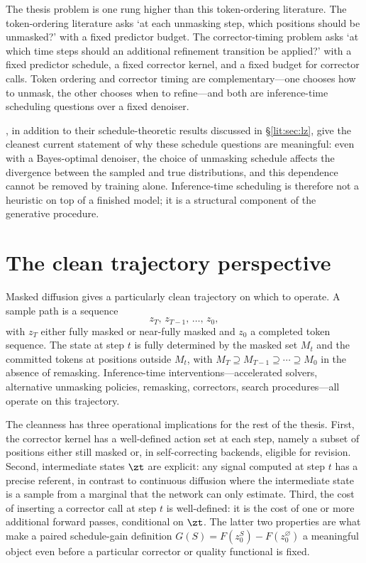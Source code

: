 The thesis problem is one rung higher than this token-ordering literature.
The token-ordering literature asks `at each unmasking step, which positions
should be unmasked?' with a fixed predictor budget. The corrector-timing
problem asks `at which time steps should an additional refinement
transition be applied?' with a fixed predictor schedule, a fixed corrector
kernel, and a fixed budget for corrector calls. Token ordering and corrector
timing are complementary---one chooses how to unmask, the other chooses
when to refine---and both are inference-time scheduling questions over a
fixed denoiser.

\textcite{chen2025optimalschedules}, in addition to their schedule-theoretic
results discussed in \S\ref{lit:sec:lz}, give the cleanest current statement
of why these schedule questions are meaningful: even with a Bayes-optimal
denoiser, the choice of unmasking schedule affects the divergence between
the sampled and true distributions, and this dependence cannot be removed
by training alone. Inference-time scheduling is therefore not a heuristic
on top of a finished model; it is a structural component of the generative
procedure.

\section{The clean trajectory perspective}
\label{lit:sec:clean-trajectory}

Masked diffusion gives a particularly clean trajectory on which to operate.
A sample path is a sequence
\[
  z_T,\, z_{T-1},\, \ldots,\, z_0,
\]
with $z_T$ either fully masked or near-fully masked and $z_0$ a completed
token sequence. The state at step $t$ is fully determined by the masked
set $M_t$ and the committed tokens at positions outside $M_t$, with
$M_T \supseteq M_{T-1} \supseteq \cdots \supseteq M_0$ in the absence of
remasking. Inference-time interventions---accelerated solvers, alternative
unmasking policies, remasking, correctors, search procedures---all operate
on this trajectory.

The cleanness has three operational implications for the rest of the
thesis. First, the corrector kernel has a well-defined action set at each
step, namely a subset of positions either still masked or, in
self-correcting backends, eligible for revision. Second, intermediate states
$\zt$ are explicit: any signal computed at step $t$ has a precise referent,
in contrast to continuous diffusion where the intermediate state is a
sample from a marginal that the network can only estimate. Third, the cost
of inserting a corrector call at step $t$ is well-defined: it is the cost
of one or more additional forward passes, conditional on $\zt$. The latter
two properties are what make a paired schedule-gain definition
$G(S) = F(z_0^{S}) - F(z_0^{\varnothing})$ a meaningful object even before
a particular corrector or quality functional is fixed.

